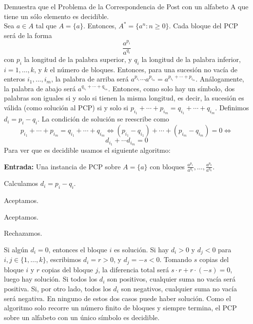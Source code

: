\begin{ejercicio}
    Demuestra que el Problema de la Correspondencia de Post con un alfabeto A que tiene un sólo elemento es decidible. \\

    Sea $a \in A$ tal que $A = \{a\}$. Entonces, $A^{*} = \{a^n : n \geq 0\}$. Cada bloque del PCP será de la forma 
    $$\dfrac{a^{p_i}}{a^{q_i}}$$ 
    con $p_i$ la longitud de la palabra superior, y $q_i$ la longitud de la palabra inferior, $i = 1, \ldots, k$, y 
    $k$ el número de bloques. Entonces, para una sucesión no vacía de enteros $i_1, \ldots, i_m$, la palabra de arriba 
    será $a^{p_{i_1}} \cdots a^{p_{i_m}} = a^{p_{i_1} + \cdots + p_{i_m}}$. Análogamente, la palabra de abajo será 
    $a^{q_{i_1} + \cdots + q_{i_m}}$. Entonces, como solo hay un símbolo, dos palabras son iguales si y solo si tienen
    la misma longitud, es decir, la sucesión es válida (como solución al PCP) si y solo si 
    $p_{i_1} + \cdots + p_{i_m} = q_{i_1} + \cdots + q_{i_m}$. Definimos $d_i = p_i - q_i$. La condición de solución
    se reescribe como
    $$p_{i_1} + \cdots + p_{i_m} = q_{i_1} + \cdots + q_{i_m} \iff 
    (p_{i_1} - q_{i_1}) + \cdots + (p_{i_m} - q_{i_m}) = 0 \iff$$$$ d_{i_1} + \cdots d_{i_m} = 0$$
    Para ver que es 
    decidible usamos el siguiente algoritmo:

    \begin{algorithm}
        \caption{MT $M_{PCP}$}
        \begin{algorithmic}
            \State \textbf{Entrada:} Una instancia de PCP sobre $A=\{a\}$ con bloques
            $\frac{a^{p_1}}{a^{q_1}},\dots,\frac{a^{p_k}}{a^{q_k}}$.

                \State Calculamos $d_i = p_i-q_i$.
            \EndFor

                \State Aceptamos.
            \EndIf

                \State Aceptamos.
            \EndIf

            \State Rechazamos.
        \end{algorithmic}
    \end{algorithm}

    Si algún $d_i = 0$, entonces el bloque $i$ es solución. Si hay $d_i > 0$ y $d_j < 0$ para $i,j \in \{1, \ldots, k\}$,
    escribimos $d_i = r > 0$, y $d_j = -s < 0$. Tomando $s$ copias del bloque $i$ y $r$ copias del bloque $j$,
    la diferencia total será $s \cdot r + r \cdot (-s) = 0$, luego hay solución. Si todos los $d_i$ son positivos,
    cualquier suma no vacía será positiva. Si, por otro lado, todos los $d_i$ son negativos, cualquier suma no vacía 
    será negativa. En ninguno de estos dos casos puede haber solución. Como el algoritmo solo recorre un número
    finito de bloques y siempre termina, el PCP sobre un alfabeto con un único símbolo es decidible.

\end{ejercicio}
